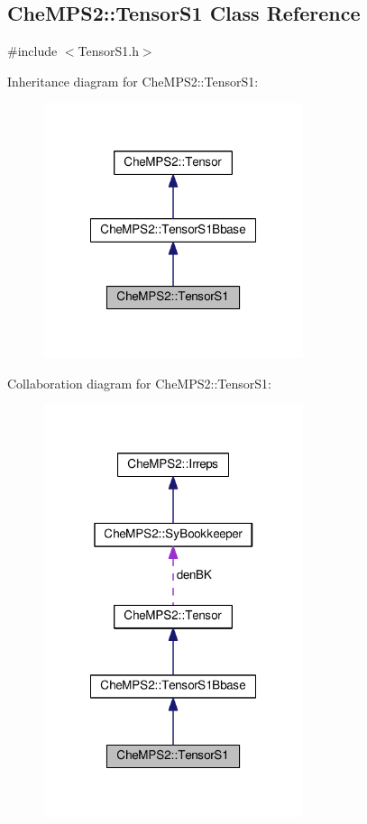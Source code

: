 \hypertarget{classCheMPS2_1_1TensorS1}{\subsection{Che\-M\-P\-S2\-:\-:Tensor\-S1 Class Reference}
\label{classCheMPS2_1_1TensorS1}
}


{\ttfamily \#include $<$Tensor\-S1.\-h$>$}



Inheritance diagram for Che\-M\-P\-S2\-:\-:Tensor\-S1\-:\nopagebreak
\begin{figure}[H]
\begin{center}
\leavevmode
\includegraphics[width=216pt]{classCheMPS2_1_1TensorS1__inherit__graph}
\end{center}
\end{figure}


Collaboration diagram for Che\-M\-P\-S2\-:\-:Tensor\-S1\-:\nopagebreak
\begin{figure}[H]
\begin{center}
\leavevmode
\includegraphics[width=216pt]{classCheMPS2_1_1TensorS1__coll__graph}
\end{center}
\end{figure}
